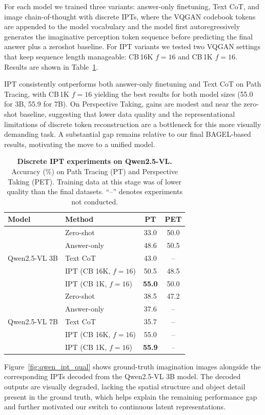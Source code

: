 For each model we trained three variants: answer-only finetuning, Text CoT, and image chain-of-thought with discrete IPTs, where the VQGAN codebook tokens are appended to the model vocabulary and the model first autoregressively generates the imaginative perception token sequence before predicting the final answer plus a zeroshot baseline. For IPT variants we tested two VQGAN settings that keep sequence length manageable: CB\,16K $f{=}16$ and CB\,1K $f{=}16$. Results are shown in Table~\ref{tab:qwen_discrete}.

IPT consistently outperforms both answer-only finetuning and Text CoT on Path Tracing, with CB\,1K $f{=}16$ yielding the best results for both model sizes (55.0 for 3B, 55.9 for 7B). On Perspective Taking, gains are modest and near the zero-shot baseline, suggesting that lower data quality and the representational limitations of discrete token reconstruction are a bottleneck for this more visually demanding task. A substantial gap remains relative to our final BAGEL-based results, motivating the move to a unified model.

\begin{table}[t]
\centering
\caption{\textbf{Discrete IPT experiments on Qwen2.5-VL.} Accuracy (\%) on Path Tracing (PT) and Perspective Taking (PET). Training data at this stage was of lower quality than the final datasets. ``--'' denotes experiments not conducted.}
\label{tab:qwen_discrete}
\setlength{\tabcolsep}{6pt}
\begin{tabular}{llcc}
\toprule
\textbf{Model} & \textbf{Method} & \textbf{PT} & \textbf{PET} \\
\midrule
\multirow{5}{*}{Qwen2.5-VL 3B}
 & Zero-shot               & 33.0          & 50.0 \\
 & Answer-only             & 48.6          & 50.5 \\
 & Text CoT                & 43.0          & --   \\
 & IPT (CB 16K, $f{=}16$) & 50.5          & 48.5 \\
 & IPT (CB 1K,\phantom{0} $f{=}16$)  & \textbf{55.0} & 50.0 \\
\midrule
\multirow{5}{*}{Qwen2.5-VL 7B}
 & Zero-shot               & 38.5          & 47.2   \\
 & Answer-only             & 37.6          & --   \\
 & Text CoT                & 35.7          & --   \\
 & IPT (CB 16K, $f{=}16$) & 55.0          & --   \\
 & IPT (CB 1K,\phantom{0} $f{=}16$)  & \textbf{55.9} & --   \\
\bottomrule
\end{tabular}
\end{table}
Figure~\ref{fig:qwen_ipt_qual} shows ground-truth imagination images alongside the corresponding IPTs decoded from the Qwen2.5-VL 3B model. The decoded outputs are visually degraded, lacking the spatial structure and object detail present in the ground truth, which helps explain the remaining performance gap and further motivated our switch to continuous latent representations.

